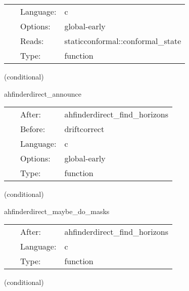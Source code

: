  \begin{tabular*}{160mm}{cll} 
~ & Language:  & c \\ 
~ & Options:  & global-early \\ 
~ & Reads:  & staticconformal::conformal\_state \\ 
~ & Type:  & function \\ 
\end{tabular*} 


\vspace{5mm}

   (conditional) 

\hspace{5mm} ahfinderdirect\_announce 

\hspace{5mm}{\it announce horizon position(s) to other thorns } 


\hspace{5mm}

 \begin{tabular*}{160mm}{cll} 
~ & After:  & ahfinderdirect\_find\_horizons \\ 
~ & Before:  & driftcorrect \\ 
~ & Language:  & c \\ 
~ & Options:  & global-early \\ 
~ & Type:  & function \\ 
\end{tabular*} 


\vspace{5mm}

   (conditional) 

\hspace{5mm} ahfinderdirect\_maybe\_do\_masks 

\hspace{5mm}{\it set mask(s) based on apparent horizon position(s) } 


\hspace{5mm}

 \begin{tabular*}{160mm}{cll} 
~ & After:  & ahfinderdirect\_find\_horizons \\ 
~ & Language:  & c \\ 
~ & Type:  & function \\ 
\end{tabular*} 


\vspace{5mm}

   (conditional) 

